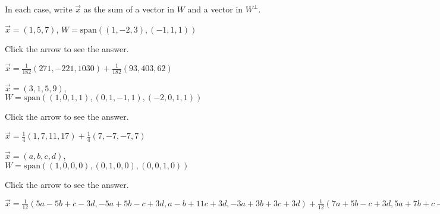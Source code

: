 \documentclass{ximera}
\begin{document}
\begin{problem}
In each case, write $\vec{x}$ as the sum of a vector in $W$ and a vector in $W^\perp$.

\begin{problem}\label{OrthoDecomp1}
$\vec{x} = (1, 5, 7)$, $W = \mbox{span}\left((1, -2, 3), (-1, 1, 1)\right)$

Click the arrow to see the answer.
\begin{expandable}
$\vec{x} = \frac{1}{182}(271,-221,1030)  + \frac{1}{182}(93,403,62)$
\end{expandable}
\end{problem}

\begin{problem}\label{OrthoDecomp3}
$\vec{x} = (3, 1, 5, 9)$, \\ $W = \mbox{span}\left((1, 0, 1, 1), (0, 1, -1, 1), (-2, 0, 1, 1)\right)$

Click the arrow to see the answer.
\begin{expandable}
$\vec{x}= \frac{1}{4}(1, 7, 11, 17) + \frac{1}{4}(7, -7, -7, 7)$
\end{expandable}
\end{problem}

\begin{problem}\label{OrthoDecomp5}
$\vec{x} = (a, b, c, d)$, \\ $W = \mbox{span}\left((1, 0, 0, 0), (0, 1, 0, 0), (0, 0, 1, 0)\right)$

Click the arrow to see the answer.
\begin{expandable}
$\vec{x} = \frac{1}{12}(5a - 5b + c - 3d, -5a + 5b - c + 3d, a - b + 11c + 3d, -3a + 3b + 3c + 3d) + \frac{1}{12}(7a + 5b - c + 3d, 5a + 7b + c - 3d, -a + b + c -3d, 3a - 3b - 3c + 9d)$
\end{expandable}
\end{problem}

\end{problem}
\end{document}
